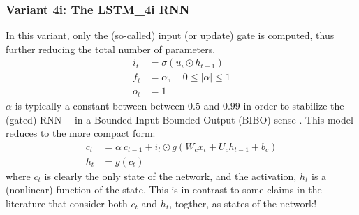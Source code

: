 \documentclass{article}
\begin{document}
\subsubsection{Variant 4i: The LSTM\_4i RNN}
In this variant, only the (so-called) input (or update) gate is computed, thus further reducing the total number of parameters.
\begin{align}
	i_t &= \sigma(u_i \odot  h_{t-1} )\\
	f_t &= \alpha,  ~~~~~ 0 \leq  | \alpha | \leq  1 \\
	o_t &= 1
\end{align}
$\alpha$ is typically a constant between between $0.5$ and $0.99$ in order to stabilize the (gated) RNN--- in a Bounded Input Bounded Output (BIBO) sense \cite{salem2016basic}.
This model reduces to the more compact form:
\begin{align}
	\label{eqn:4431}	 c_t &=  \alpha ~ c_{t-1} + i_t \odot g(W_c x_t + U_c h_{t-1} + b_c)\\
	\label{eqn:4441}	h_t &=  g(c_t)
\end{align}
where $c_t$ is clearly the only state of the network, and the activation, $h_t$ is a (nonlinear) function of the state. This is in contrast to some claims in the literature that consider both $c_t$ and $h_t$, togther, as states of the network!
\end{document}

